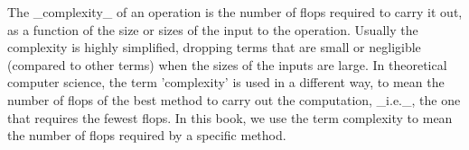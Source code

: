 The _complexity_ of an operation is the number of flops required to carry it out, as a function of the size or sizes of the input to the operation. Usually the complexity is highly simplified, dropping terms that are small or negligible (compared to other terms) when the sizes of the inputs are large. In theoretical computer science, the term 'complexity' is used in a different way, to mean the number of flops of the best method to carry out the computation, _i.e._, the one that requires the fewest flops. In this book, we use the term complexity to mean the number of flops required by a specific method.

 